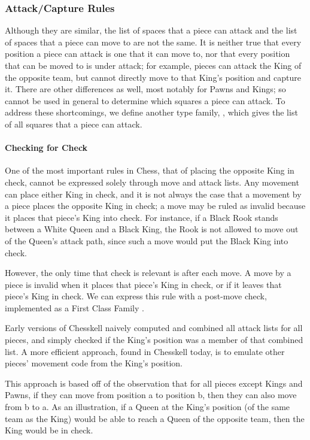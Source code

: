 \subsubsection{Attack/Capture Rules}

Although they are similar, the list of spaces that a piece can attack and the list of spaces that a piece can move to are not the same. It is neither true that every position a piece can attack is one that it can move to, nor that every position that can be moved to is under attack; for example, pieces can attack the King of the opposite team, but cannot directly move to that King's position and capture it. There are other differences as well, most notably for Pawns and Kings; so  cannot be used in general to determine which squares a piece can attack. To address these shortcomings, we define another type family, , which gives the list of all squares that a piece can attack.

\paragraph{Checking for Check} \label{checksection}

One of the most important rules in Chess, that of placing the opposite King in check, cannot be expressed solely through move and attack lists. Any movement can place either King in check, and it is not always the case that a movement by a piece places the opposite King in check; a move may be ruled as invalid because it places that piece's King into check. For instance, if a Black Rook stands between a White Queen and a Black King, the Rook is not allowed to move out of the Queen's attack path, since such a move would put the Black King into check.

However, the only time that check is relevant is after each move. A move by a piece is invalid when it places that piece's King in check, or if it leaves that piece's King in check. We can express this rule with a post-move check, implemented as a First Class Family .

Early versions of Chesskell naively computed and combined all attack lists for all pieces, and simply checked if the King's position was a member of that combined list. A more efficient approach, found in Chesskell today, is to emulate other pieces' movement code from the King's position.

This approach is based off of the observation that for all pieces except Kings and Pawns, if they can move from position a to position b, then they can also move from b to a. As an illustration, if a Queen at the King's position (of the same team as the King) would be able to reach a Queen of the opposite team, then the King would be in check.

